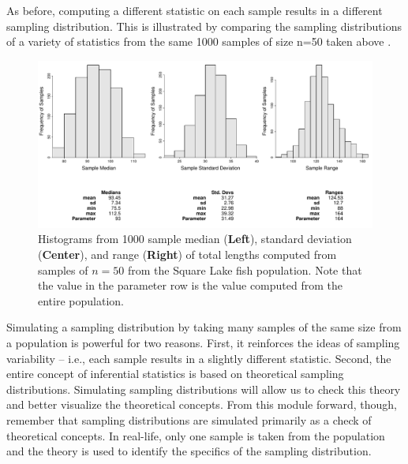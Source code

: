 \documentclass[10pt,openany]{book}\usepackage[]{graphicx}\usepackage[]{color}
\newenvironment{knitrout}{}{} %
\begin{document}
As before, computing a different statistic on each sample results in a different sampling distribution. This is illustrated by comparing the sampling distributions of a variety of statistics from the same 1000 samples of size n=50 taken above .

\begin{knitrout}
\color{fgcolor}\begin{figure}[hbtp]

{\centering \includegraphics[width=.95\linewidth]{Figs/SampDistSLOther50-1} 

}

\caption[Histograms from 1000 sample median (\textbf{Left}), standard deviation (\textbf{Center}), and range (\textbf{Right}) of total lengths computed from samples of $n=50$ from the Square Lake fish population]{Histograms from 1000 sample median (\textbf{Left}), standard deviation (\textbf{Center}), and range (\textbf{Right}) of total lengths computed from samples of $n=50$ from the Square Lake fish population. Note that the value in the parameter row is the value computed from the entire population.}\label{fig:SampDistSLOther50}
\end{figure}


\end{knitrout}
\vspace{12pt}  %

Simulating a sampling distribution by taking many samples of the same size from a population is powerful for two reasons. First, it reinforces the ideas of sampling variability -- i.e., each sample results in a slightly different statistic. Second, the entire concept of inferential statistics is based on theoretical sampling distributions. Simulating sampling distributions will allow us to check this theory and better visualize the theoretical concepts. From this module forward, though, remember that sampling distributions are simulated primarily as a check of theoretical concepts. In real-life, only one sample is taken from the population and the theory is used to identify the specifics of the sampling distribution.
\end{document}
